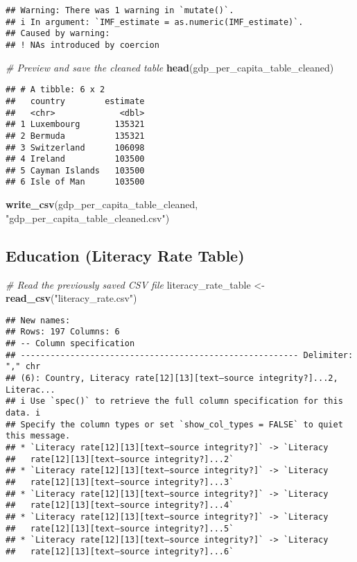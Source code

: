 \documentclass[
]{article}
\newenvironment{Shaded}{\begin{snugshade}}{\end{snugshade}}
\newcommand{\CommentTok}[1]{\textcolor[rgb]{0.56,0.35,0.01}{\textit{#1}}}
\newcommand{\FunctionTok}[1]{\textcolor[rgb]{0.13,0.29,0.53}{\textbf{#1}}}
\newcommand{\NormalTok}[1]{#1}
\newcommand{\OtherTok}[1]{\textcolor[rgb]{0.56,0.35,0.01}{#1}}
\newcommand{\StringTok}[1]{\textcolor[rgb]{0.31,0.60,0.02}{#1}}
\begin{document}
\begin{verbatim}
## Warning: There was 1 warning in `mutate()`.
## i In argument: `IMF_estimate = as.numeric(IMF_estimate)`.
## Caused by warning:
## ! NAs introduced by coercion
\end{verbatim}

\begin{Shaded}
\begin{Highlighting}[]
\CommentTok{\# Preview and save the cleaned table}
\FunctionTok{head}\NormalTok{(gdp\_per\_capita\_table\_cleaned) }
\end{Highlighting}
\end{Shaded}

\begin{verbatim}
## # A tibble: 6 x 2
##   country        estimate
##   <chr>             <dbl>
## 1 Luxembourg       135321
## 2 Bermuda          135321
## 3 Switzerland      106098
## 4 Ireland          103500
## 5 Cayman Islands   103500
## 6 Isle of Man      103500
\end{verbatim}

\begin{Shaded}
\begin{Highlighting}[]
\FunctionTok{write\_csv}\NormalTok{(gdp\_per\_capita\_table\_cleaned, }\StringTok{"gdp\_per\_capita\_table\_cleaned.csv"}\NormalTok{)}
\end{Highlighting}
\end{Shaded}

\subsection{Education (Literacy Rate
Table)}\label{education-literacy-rate-table}

\begin{Shaded}
\begin{Highlighting}[]
\CommentTok{\# Read the previously saved CSV file}
\NormalTok{literacy\_rate\_table }\OtherTok{\textless{}{-}} \FunctionTok{read\_csv}\NormalTok{(}\StringTok{"literacy\_rate.csv"}\NormalTok{)}
\end{Highlighting}
\end{Shaded}

\begin{verbatim}
## New names:
## Rows: 197 Columns: 6
## -- Column specification
## -------------------------------------------------------- Delimiter: "," chr
## (6): Country, Literacy rate[12][13][text–source integrity?]...2, Literac...
## i Use `spec()` to retrieve the full column specification for this data. i
## Specify the column types or set `show_col_types = FALSE` to quiet this message.
## * `Literacy rate[12][13][text–source integrity?]` -> `Literacy
##   rate[12][13][text–source integrity?]...2`
## * `Literacy rate[12][13][text–source integrity?]` -> `Literacy
##   rate[12][13][text–source integrity?]...3`
## * `Literacy rate[12][13][text–source integrity?]` -> `Literacy
##   rate[12][13][text–source integrity?]...4`
## * `Literacy rate[12][13][text–source integrity?]` -> `Literacy
##   rate[12][13][text–source integrity?]...5`
## * `Literacy rate[12][13][text–source integrity?]` -> `Literacy
##   rate[12][13][text–source integrity?]...6`
\end{verbatim}
\end{document}
